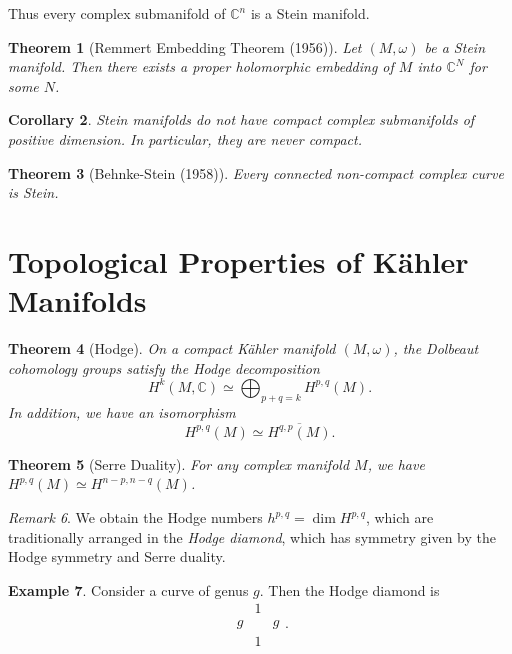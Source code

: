 \documentclass[leqno, openany]{memoir}
\newtheorem{thm}{Theorem}[chapter]
\newtheorem{cor}[thm]{Corollary}
\theoremstyle{definition}
\newtheorem{exm}[thm]{Example}
\theoremstyle{remark}
\newtheorem{rmk}[thm]{Remark}
\theoremstyle{plain}
\theoremstyle{definition}
\theoremstyle{remark}
\newcommand{\C}{\mathbb{C}}
\begin{document}
Thus every complex submanifold of $\C^n$ is a Stein manifold.

\begin{thm}[Remmert Embedding Theorem (1956)]
    Let $(M, \omega)$ be a Stein manifold. Then there exists a proper holomorphic embedding of $M$ into $\C^N$ for some $N$.
\end{thm}

\begin{cor}
    Stein manifolds do not have compact complex submanifolds of positive dimension. In particular, they are never compact.
\end{cor}

\begin{thm}[Behnke-Stein (1958)]
    Every connected non-compact complex curve is Stein.
\end{thm}

\section{Topological Properties of K\"ahler Manifolds}%
\label{sec:topological_properties_of_k"ahler_manifolds}

\begin{thm}[Hodge]
    On a compact K\"ahler manifold $(M, \omega)$, the Dolbeaut cohomology groups satisfy the Hodge decomposition
    \[ H^k(M, \C) \simeq \bigoplus_{p+q=k} H^{p,q}(M). \]
    In addition, we have an isomorphism
    \[ H^{p,q}(M) \simeq \overline{H^{q,p}(M)}. \]
\end{thm}

\begin{thm}[Serre Duality]
    For any complex manifold $M$, we have $H^{p,q}(M) \simeq H^{n-p,n-q}(M)$.
\end{thm}

\begin{rmk}
    We obtain the Hodge numbers $h^{p,q} = \dim H^{p,q}$, which are traditionally arranged in the \textit{Hodge diamond}, which has symmetry given by the Hodge symmetry and Serre duality.
\end{rmk}

\begin{exm}
    Consider a curve of genus $g$. Then the Hodge diamond is
    \[ \begin{array}{ccc}
        & 1 & \\
        g & & g \\
          & 1 &
    \end{array}.\]
\end{exm}
\end{document}
